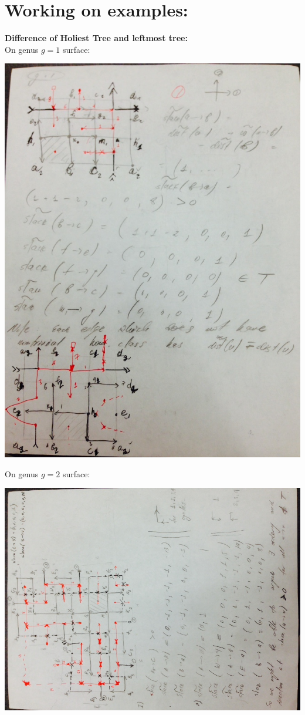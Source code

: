 \documentclass{article}
\begin{document}
\section{Working on examples:}
\textbf{Difference of Holiest Tree and leftmost tree:} \\
On genus $g = 1$ surface:
\begin{center}
\includegraphics[scale = 0.6]{genus1.jpg}
\end{center}

\newpage
On genus $g = 2$ surface:
\begin{center}
\includegraphics[angle = -90, scale = 0.7]{genus2.jpg}
\end{center}
\newpage
\end{document}
